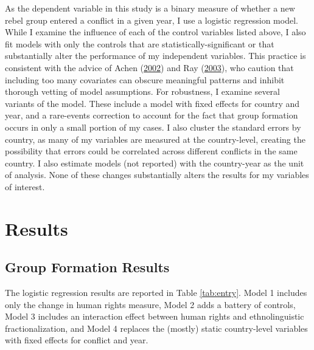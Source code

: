 \documentclass[12pt,]{book}
\theoremstyle{definition}
\theoremstyle{definition}
\theoremstyle{definition}
\theoremstyle{remark}
\begin{document}
As the dependent variable in this study is a binary measure of whether a
new rebel group entered a conflict in a given year, I use a logistic
regression model. While I examine the influence of each of the control
variables listed above, I also fit models with only the controls that
are statistically-significant or that substantially alter the
performance of my independent variables. This practice is consistent
with the advice of Achen (\protect\hyperlink{ref-Achen2002a}{2002}) and
Ray (\protect\hyperlink{ref-Ray2003}{2003}), who caution that including
too many covariates can obscure meaningful patterns and inhibit thorough
vetting of model assumptions. For robustness, I examine several variants
of the model. These include a model with fixed effects for country and
year, and a rare-events correction to account for the fact that group
formation occurs in only a small portion of my cases. I also cluster the
standard errors by country, as many of my variables are measured at the
country-level, creating the possibility that errors could be correlated
across different conflicts in the same country. I also estimate models
(not reported) with the country-year as the unit of analysis. None of
these changes substantially alters the results for my variables of
interest.

\hypertarget{results}{%
\section{Results}\label{results}}

\hypertarget{group-formation-results}{%
\subsection{Group Formation Results}\label{group-formation-results}}

The logistic regression results are reported in Table \ref{tab:entry}.
Model 1 includes only the change in human rights measure, Model 2 adds a
battery of controls, Model 3 includes an interaction effect between
human rights and ethnolinguistic fractionalization, and Model 4 replaces
the (mostly) static country-level variables with fixed effects for
conflict and year.
\end{document}
